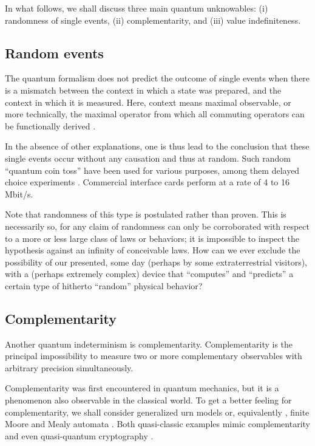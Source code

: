 \documentclass[rmp,amsfonts,showpacs,showkeys]{revtex4}
\begin{document}
In what follows, we shall discuss three main quantum unknowables:
(i) randomness of single events,
(ii) complementarity, and
(iii) value indefiniteness.

\subsection{Random events}

The quantum formalism does not predict the outcome of single events
when there is a mismatch between the context in which a state was prepared,
and the context in which it is measured.
Here, context means maximal observable, or more technically,
the maximal operator from which all commuting operators can be functionally derived
\cite[\S 84]{halmos-vs}.

In the absence of other explanations, one is thus lead to the conclusion
that these single events occur without any causation
and thus at random.
Such random ``quantum coin toss'' \cite{svozil-qct}
have been used for various purposes, among them delayed choice experiments
\cite{wjswz-98,zeilinger:qct}.
Commercial interface cards \cite{Quantis} perform at a rate of 4 to 16 Mbit/s.

Note that randomness of this type \cite{Cris04,calude-dinneen05}
is postulated rather than proven.
This is necessarily so, for any claim of randomness can only be corroborated
with respect to a more or less large class of laws or behaviors;
it is impossible to inspect the hypothesis against an infinity of conceivable laws.
How can we ever exclude the possibility of our
presented, some day (perhaps by some extraterrestrial visitors), with a (perhaps
extremely complex) device  that ``computes'' and ``predicts''
a certain type of hitherto ``random'' physical behavior?


\subsection{Complementarity}

Another quantum indeterminism is complementarity.
Complementarity is the principal impossibility to measure
two or more complementary observables
with arbitrary precision simultaneously.

Complementarity was first encountered in quantum mechanics,
but it is a phenomenon also observable in the classical world.
To get a better feeling for complementarity, we shall consider generalized urn models
\cite{wright,wright:pent} or, equivalently \cite{svozil-2001-eua},
finite Moore and Mealy automata \cite{e-f-moore,schaller-96,dvur-pul-svo,cal-sv-yu}.
Both quasi-classic examples mimic complementarity and even quasi-quantum cryptography
\cite{svozil-2005-ln1e}.
\end{document}
